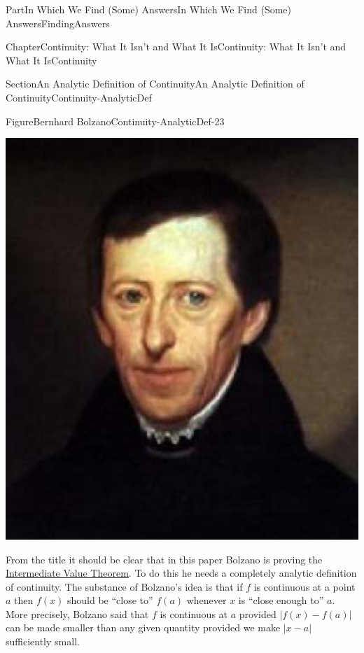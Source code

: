 \documentclass[oneside,10pt,]{book}
\numberwithin{equation}{part}
\newcommand{\abs}[1]{\left|#1\right|}
\begin{document}
\begin{partptx}{Part}{In Which We Find (Some) Answers}{}{In Which We Find (Some) Answers}{}{}{FindingAnswers}
\begin{chapterptx}{Chapter}{Continuity: What It Isn't and What It Is}{}{Continuity: What It Isn't and What It Is}{}{}{Continuity}
\begin{sectionptx}{Section}{An Analytic Definition of Continuity}{}{An Analytic Definition of Continuity}{}{}{Continuity-AnalyticDef}
\begin{figureptx}{Figure}{Bernhard Bolzano}{Continuity-AnalyticDef-23}{}
\begin{image}{0.325}{0.35}{0.325}{}
\includegraphics[width=\linewidth]{external/images/Bolzano.png}
\end{image}%
\tcblower
\end{figureptx}%
From the title it should be clear that in this paper Bolzano is proving the \hyperref[IntermediateValueTheorem]{Intermediate Value Theorem}.  To do this he needs a completely analytic definition of continuity.  The substance of Bolzano's idea is that if \(f\) is continuous at a point \(a\) then \(f(x)\) should be ``close to'' \(f(a)\) whenever \(x\) is ``close enough to'' \(a\).  More precisely, Bolzano said that \(f\) is continuous at \(a\) provided \(\abs{f(x)-f(a)}\) can be made smaller than any given quantity provided we make \(\abs{x-a}\) sufficiently small.%
\par

\end{sectionptx}
\end{chapterptx}
\end{partptx}
\end{document}
